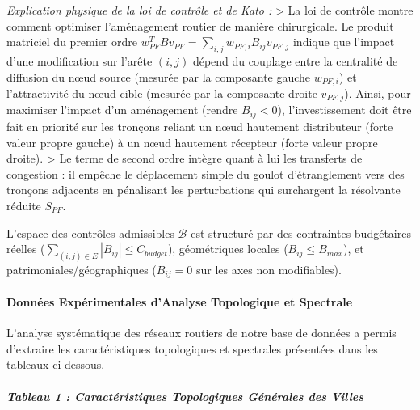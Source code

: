 \documentclass[10pt, a4paper]{article}
\begin{document}
\emph{Explication physique de la loi de contrôle et de Kato :}
\textgreater{} La loi de contrôle montre comment optimiser l'aménagement
routier de manière chirurgicale. Le produit matriciel du premier ordre
\(w_{PF}^T B v_{PF} = \sum_{i,j} w_{PF, i} B_{ij} v_{PF, j}\) indique
que l'impact d'une modification sur l'arête \((i, j)\) dépend du
couplage entre la centralité de diffusion du nœud source (mesurée par la
composante gauche \(w_{PF, i}\)) et l'attractivité du nœud cible
(mesurée par la composante droite \(v_{PF, j}\)). Ainsi, pour maximiser
l'impact d'un aménagement (rendre \(B_{ij} < 0\)), l'investissement doit
être fait en priorité sur les tronçons reliant un nœud hautement
distributeur (forte valeur propre gauche) à un nœud hautement récepteur
(forte valeur propre droite). \textgreater{} Le terme de second ordre
intègre quant à lui les transferts de congestion : il empêche le
déplacement simple du goulot d'étranglement vers des tronçons adjacents
en pénalisant les perturbations qui surchargent la résolvante réduite
\(S_{PF}\).

L'espace des contrôles admissibles \(\mathcal{B}\) est structuré par des
contraintes budgétaires réelles
(\(\sum_{(i,j) \in E} |B_{ij}| \le C_{budget}\)), géométriques locales
(\(B_{ij} \le B_{max}\)), et patrimoniales/géographiques (\(B_{ij} = 0\)
sur les axes non modifiables).

\paragraph{Données Expérimentales d'Analyse Topologique et
Spectrale}\label{donnuxe9es-expuxe9rimentales-danalyse-topologique-et-spectrale}

L'analyse systématique des réseaux routiers de notre base de données a
permis d'extraire les caractéristiques topologiques et spectrales
présentées dans les tableaux ci-dessous.

\subparagraph{Tableau 1 : Caractéristiques Topologiques Générales des
Villes}\label{tableau-1-caractuxe9ristiques-topologiques-guxe9nuxe9rales-des-villes}
\end{document}

